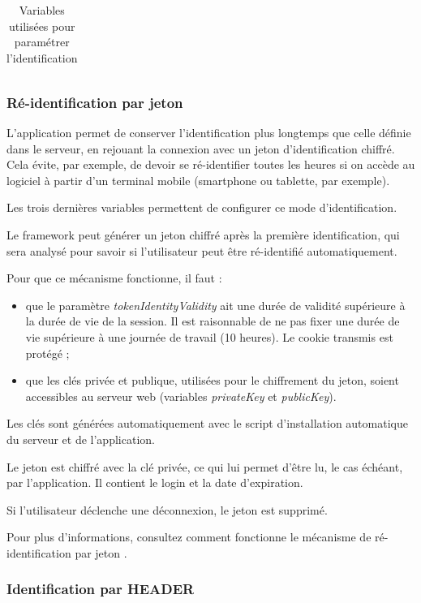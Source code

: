 \begin{longtable}{|p{6cm}|p{10cm}|}
\caption{Variables utilisées pour paramétrer l'identification}
\end{longtable}

\subsubsection{Ré-identification par jeton}

L'application permet de conserver l'identification plus longtemps que celle définie dans le serveur, en rejouant la connexion avec un jeton d'identification chiffré. Cela évite, par exemple, de devoir se ré-identifier toutes les heures si on accède au logiciel à partir d'un terminal mobile (smartphone ou tablette, par exemple).

Les trois dernières variables permettent de configurer ce mode d'identification. 

Le framework peut générer un jeton chiffré après la première identification, qui sera analysé pour savoir si l'utilisateur peut être ré-identifié automatiquement.

Pour que ce mécanisme fonctionne, il faut :
\begin{itemize}
\item que le paramètre \textit{tokenIdentityValidity} ait une durée de validité supérieure à la durée de vie de la session. Il est raisonnable de ne pas fixer une durée de vie supérieure à une journée de travail (10 heures). Le cookie transmis est protégé ;
\item que les clés privée et publique, utilisées pour le chiffrement du jeton, soient accessibles au serveur web (variables \textit{privateKey} et \textit{publicKey}).
\end{itemize}

Les clés sont générées automatiquement avec le script d'installation automatique du serveur et de l'application.

Le jeton est chiffré avec la clé privée, ce qui lui permet d'être lu, le cas échéant, par l'application. Il contient le login et la date d'expiration. 

Si l'utilisateur déclenche une déconnexion, le jeton est supprimé.

Pour plus d'informations, consultez comment fonctionne le mécanisme de ré-identification par jeton \cite{token}.

\subsubsection{Identification par HEADER}


